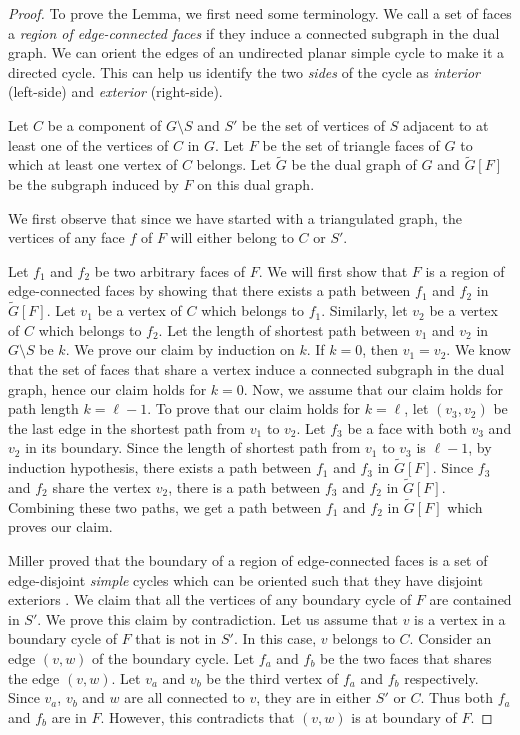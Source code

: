 \documentclass[11pt]{article}
\numberwithin{equation}{section}
\theoremstyle{definition}
\theoremstyle{plain}
\begin{document}
\begin{proof}
To prove the Lemma, we first need some terminology. We call a set of faces a \emph{region of edge-connected faces} if they induce a connected subgraph in the dual graph. We can orient the edges of an undirected planar simple cycle to make it a directed cycle. This can help us identify the two \emph{sides} of the cycle as \emph{interior} (left-side) and \emph{exterior} (right-side).

Let $C$ be a component of $G \setminus S$ and $S'$ be the set of vertices of $S$ adjacent to at least one of the vertices of $C$ in $G$. Let $F$ be the set of triangle faces of $G$ to which at least one vertex of $C$ belongs. Let $\tilde{G}$ be the dual graph of $G$ and $\tilde{G}[F]$ be the subgraph induced by $F$ on this dual graph.  %
%
%
%
%
%
%

%
We first observe that since we have started with a triangulated graph, the vertices of any face $f$ of $F$ will either belong to $C$ or $S'$. 

Let $f_1$ and $f_2$ be two arbitrary faces of $F$. We will first show that $F$ is a region of edge-connected faces by showing that there exists a path between $f_1$ and $f_2$ in $\tilde{G}[F]$. Let $v_1$ be a vertex of $C$ which belongs to $f_1$. Similarly, let $v_2$ be a vertex of $C$ which belongs to $f_2$. Let the length of shortest path between $v_1$ and $v_2$ in $G \setminus S$ be $k$. We prove our claim by induction on $k$. If $k = 0$, then $v_1 = v_2$. We know that the set of faces that share a vertex induce a connected subgraph in the dual graph, hence our claim holds for $k=0$.
Now, we assume that our claim holds for path length $k = \ell-1$. To prove that our claim holds for $k= \ell$, let $(v_3, v_2)$ be the last edge in the shortest path from $v_1$ to $v_2$. Let $f_3$ be a face with both $v_3$ and $v_2$ in its boundary. Since the length of shortest path from $v_1$ to $v_3$ is $\ell-1$, by induction hypothesis, there exists a path between $f_1$ and $f_3$ in $\tilde{G}[F]$. Since $f_3$ and $f_2$ share the vertex $v_2$, there is a path between $f_3$ and $f_2$ in $\tilde{G}[F]$. Combining these two paths, we get a path between $f_1$ and $f_2$ in $\tilde{G}[F]$ which proves our claim.

Miller proved that the boundary of a region of edge-connected faces is a set of edge-disjoint \emph{simple} cycles which can be oriented such that they have disjoint exteriors \cite{Miller}. We claim that all the vertices of any boundary cycle of $F$ are contained in $S'$. We prove this claim by contradiction. Let us assume that $v$ is a vertex in a boundary cycle of $F$ that is not %
 in $S'$. In this case, $v$ belongs to $C$. Consider an edge $(v,w)$ of the boundary cycle. Let $f_a$ and $f_b$ be the two faces that shares the edge $(v,w)$. Let $v_a$ and $v_b$ be the third vertex of $f_a$ and $f_b$ respectively. Since $v_a$, $v_b$ and $w$ are all connected to $v$, they are %
 in either $S'$ or $C$. Thus both $f_a$ and $f_b$ are in $F$. However, this contradicts that $(v,w)$ is at boundary of $F$. 


\end{proof}
\end{document}

